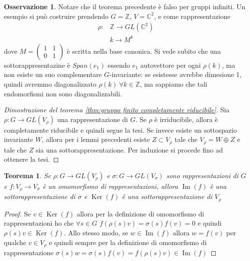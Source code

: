 \documentclass[11pt]{article}
\theoremstyle{plain}
\newtheorem{thm}{Teorema}[section]
\theoremstyle{definition}
\newtheorem*{rem}{Osservazione}
\theoremstyle{remark}
\newcommand{\C}{\mathbb{C}}
\newcommand{\Z}{\mathbb{Z}}
\DeclareMathOperator{\Ker}{Ker}
\DeclareMathOperator{\Imm}{Im}
\begin{document}
\begin{rem} Notare che il teorema precedente è falso per gruppi infiniti. Un esempio si può costruire prendendo $G=\Z$, $V=\C^2$, e come rappresentazione
\begin{align*}
	\rho:&\Z\to GL(\C^2)\\
	&k\to M^k
\end{align*}
dove $M=\begin{pmatrix}
        	1 & 1\\
        	0 & 1
        \end{pmatrix}$ è scritta nella base canonica.\newline
Si vede subito che una sottorappresentazine è $Span(e_1)$ essendo $e_1$ autovettore per ogni $\rho(k)$, ma non esiste un suo complementare $G$-invariante: se esistesse avrebbe dimesione 1, quindi avremmo diagonalizzato $\rho(k)\ \forall k\in \Z$, ma sappiamo che tali endomorfismi non sono diagonalizzabili.
\end{rem}


\begin{proof}[Dimostrazione del teorema \ref{thm:gruppo finito completamente riducibile}]
Sia $\rho: G \to GL(V_\rho)$ una rappresentazione di $G$. Se $\rho$ è irriducibile, allora è completamente riducibile e quindi segue la tesi. Se invece esiste un sottospazio invariante $W$, allora per i lemmi precedenti esiste $Z \subset V_\rho$ tale che $V_\rho = W \oplus Z$ e tale che $Z$ sia una sottorappresentazione. Per induzione si procede fino ad ottenere la tesi. %
\end{proof}




\begin{thm} Se $\rho: G \to GL(V_\rho)$ e $\sigma: G \to GL(V_\sigma)$ sono rappresentazioni di $G$ e $f: V_\rho \to V_\sigma$ è un omomorfismo di rappresentazioni, allora $\Imm(f)$ è una sottorappresentazione di $\sigma$ e $\Ker(f)$ è una sottorappresentazione di $V_\rho$
\end{thm}
\begin{proof}
Se $v\in \Ker(f)$ allora per la definizione di omomorfismo di rappresentazioni ho che $\forall s\in G$ $f(\rho(s)v)=\sigma(s)f(v)=0$ e quindi $\rho(s)v\in \Ker(f)$. Allo stesso modo, se $w\in \Imm(f)$ allora $w=f(v)$ per qualche $v\in V_\rho$ e quindi sempre per la definizione di omomorfismo di rappresentazione $\sigma(s)w=\sigma(s)f(v)=f(\rho(s)v)\in \Imm(f)$
\end{proof}
\end{document}
